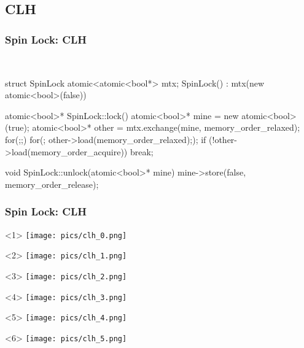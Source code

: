 \documentclass[UTF8,lualatex]{ctexbeamer}
\begin{document}
\subsection{CLH}

\begin{frame}[fragile]
    \frametitle{Spin Lock: CLH}
    \scriptsize
    \begin{block}{~}
        \begin{cppcode}
            struct SpinLock {
                atomic<atomic<bool*> mtx;
                SpinLock()
                :   mtx(new atomic<bool>(false)) {}
            }

            atomic<bool>* SpinLock::lock() {
                atomic<bool>* mine = new atomic<bool>(true);
                atomic<bool>* other = mtx.exchange(mine, memory_order_relaxed);
                for(;;) {
                    for(; other->load(memory_order_relaxed););
                    if (!other->load(memory_order_acquire)) {
                        break;
                    }
                }
            }

            void SpinLock::unlock(atomic<bool>* mine) {
                mine->store(false, memory_order_release);
            }
        \end{cppcode}
    \end{block}
\end{frame}

\begin{frame}[t]
    \frametitle{Spin Lock: CLH}
    \begin{onlyenv}<1>
        \texttt{[image: pics/clh\_0.png]}
    \end{onlyenv}
    \begin{onlyenv}<2>
        \texttt{[image: pics/clh\_1.png]}
    \end{onlyenv}
    \begin{onlyenv}<3>
        \texttt{[image: pics/clh\_2.png]}
    \end{onlyenv}
    \begin{onlyenv}<4>
        \texttt{[image: pics/clh\_3.png]}
    \end{onlyenv}
    \begin{onlyenv}<5>
        \texttt{[image: pics/clh\_4.png]}
    \end{onlyenv}
    \begin{onlyenv}<6>
        \texttt{[image: pics/clh\_5.png]}
    \end{onlyenv}
\end{frame}
\end{document}
